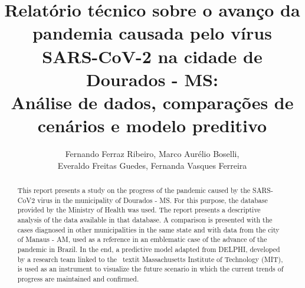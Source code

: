 \documentclass[12pt]{article}
\begin{document}
 


\title{Relatório técnico sobre o avanço da pandemia causada pelo vírus SARS-CoV-2 na cidade de Dourados - MS:\\ Análise de dados, comparações de cenários e modelo preditivo}

\author{Fernando Ferraz Ribeiro, Marco Aurélio Boselli,\\ Everaldo Freitas Guedes, Fernanda Vasques Ferreira}
  

 

\address{Universidade Federal da Bahia -- Faculdade de Arquitetura -- LCAD
  (UFBA)\\
  Salvador, BA -- Brasil
\nextinstitute
  Universidade Federal de Uberlândia  -- Instituto de Física (UFU)\\
  Uberlândia, MG -- Brasil 
\nextinstitute
  Bacharel em Estatística, Doutor e Mestre em \\Modelagem Computacional Aplicada à Tecnologia Industrial\\
  Salvador, BA -- Brasil
\nextinstitute
  Universidade Federal do Oeste da Bahia (UFOB)\\
  Santa Maria da Vitória, BA -- Brasil
}


\maketitle

\begin{abstract}

  This report presents a study on the progress of the pandemic caused by the SARS-CoV2 virus in the municipality of Dourados - MS. For this purpose, the database provided by the Ministry of Health was used. The report presents a descriptive analysis of the data available in that database. A comparison is presented with the cases diagnosed in other municipalities in the same state and with data from the city of Manaus - AM, used as a reference in an emblematic case of the advance of the pandemic in Brazil. In the end, a predictive model adapted from DELPHI, developed by a research team linked to the \ textit {Massachusetts Institute of Technology} (MIT), is used as an instrument to visualize the future scenario in which the current trends of progress are maintained and confirmed.

\end{abstract}
     
\end{document}
